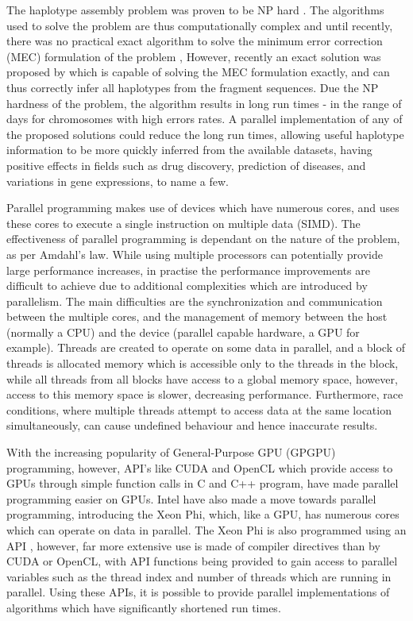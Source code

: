 \documentclass[10pt,a4paer,twocolumn]{article}
\begin{document}
The haplotype assembly problem was proven to be NP hard \cite{lippert:2002}. The algorithms used to solve the
problem are thus computationally complex and until recently, there was no practical exact algorithm to solve 
the minimum error correction (MEC) formulation of the problem \cite{bonizzoni:2003},
However, recently an exact solution was proposed by \cite{chen:2013} which is capable of solving the MEC 
formulation exactly, and can thus correctly infer all haplotypes from the fragment sequences. Due the NP hardness 
of the problem, the algorithm results in long run times - in the range of days for chromosomes with high
errors rates. A parallel implementation of any of the proposed solutions could reduce the long run
times, allowing useful haplotype information to be more quickly inferred from the available datasets, having
positive effects in fields such as drug discovery, prediction of diseases, and variations in gene
expressions, to name a few. 

Parallel programming makes use of devices which have numerous cores, and uses these cores to execute a single
instruction on multiple data (SIMD). The effectiveness of parallel programming is dependant on the nature of 
the problem, as per Amdahl's law. While using multiple processors can potentially provide large performance 
increases, in practise the performance improvements are difficult to achieve due to additional complexities 
which are introduced by parallelism. The main difficulties are the synchronization and communication between 
the multiple cores, and the management of memory between the host (normally a CPU) and the device (parallel
capable hardware, a GPU for example). Threads are created to operate on some data in parallel, and a block of
threads is allocated memory which is accessible only to the threads in the block, while all threads from all
blocks have access  to a global memory space, however, access to this  memory space is slower, decreasing 
performance. Furthermore, race conditions, where multiple threads attempt to access data at the same location 
simultaneously, can cause undefined behaviour and hence inaccurate results.

With the increasing popularity of General-Purpose GPU (GPGPU) programming, however, API's like CUDA
\cite{nvidia:2015} and OpenCL \cite{khronos:2015}
which provide access to GPUs through simple function calls in C and C++ program, have made parallel programming
easier on GPUs. Intel have also made a move towards parallel programming, introducing the Xeon Phi, which, like 
a GPU, has numerous cores which can operate on data in parallel. The Xeon Phi is also programmed using an API 
\cite{intel:2013}, however, far more extensive use is made of compiler directives than by CUDA or OpenCL, 
with API functions being provided to gain access to parallel variables such as the thread index and number of 
threads which are running in parallel. Using these APIs, it is possible to provide parallel implementations of
algorithms which have significantly shortened run times.
\end{document}
